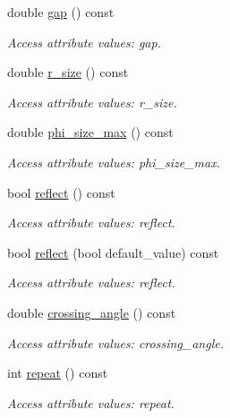 \begin{DoxyCompactItemize}
double \hyperlink{struct_d_d4hep_1_1_x_m_l_1_1_child_value_a60a898fb4a04d474883c0d82561e40f2}{gap} () const
\begin{DoxyCompactList}\small\item\em Access attribute values\+: gap. \end{DoxyCompactList}\item 
double \hyperlink{struct_d_d4hep_1_1_x_m_l_1_1_child_value_aebfd9e77ae3946bb7fc604c86e9355a6}{r\+\_\+size} () const
\begin{DoxyCompactList}\small\item\em Access attribute values\+: r\+\_\+size. \end{DoxyCompactList}\item 
double \hyperlink{struct_d_d4hep_1_1_x_m_l_1_1_child_value_a8ac7ccb1d78edffb482d72cd247b0c45}{phi\+\_\+size\+\_\+max} () const
\begin{DoxyCompactList}\small\item\em Access attribute values\+: phi\+\_\+size\+\_\+max. \end{DoxyCompactList}\item 
bool \hyperlink{struct_d_d4hep_1_1_x_m_l_1_1_child_value_a9e8a8556426c351b7c43754d8f632655}{reflect} () const
\begin{DoxyCompactList}\small\item\em Access attribute values\+: reflect. \end{DoxyCompactList}\item 
bool \hyperlink{struct_d_d4hep_1_1_x_m_l_1_1_child_value_a55834ecbee97980353b3b351473702b0}{reflect} (bool default\+\_\+value) const
\begin{DoxyCompactList}\small\item\em Access attribute values\+: reflect. \end{DoxyCompactList}\item 
double \hyperlink{struct_d_d4hep_1_1_x_m_l_1_1_child_value_a96ba52debc279109ab0a7440614fdb3d}{crossing\+\_\+angle} () const
\begin{DoxyCompactList}\small\item\em Access attribute values\+: crossing\+\_\+angle. \end{DoxyCompactList}\item 
int \hyperlink{struct_d_d4hep_1_1_x_m_l_1_1_child_value_aaa9f9cd0cfae3cdfd833ff2f5f685f2d}{repeat} () const
\begin{DoxyCompactList}\small\item\em Access attribute values\+: repeat. \end{DoxyCompactList}\item 

\end{DoxyCompactItemize}

